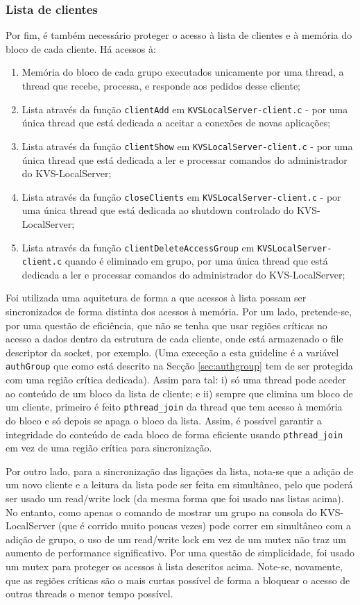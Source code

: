 \subsubsection{Lista de clientes}
Por fim, é também necessário proteger o acesso à lista de clientes e à memória do bloco de cada cliente. Há acessos à:
\begin{enumerate}[noitemsep]
    \item Memória do bloco de cada grupo executados unicamente por uma thread, a thread que recebe, processa, e responde aos pedidos desse cliente;
    \item Lista através da função \texttt{clientAdd} em \texttt{KVSLocalServer-client.c} - por uma única thread que está dedicada a aceitar a conexões de novas aplicações;
    \item Lista através da função \texttt{clientShow} em \texttt{KVSLocalServer-client.c} - por uma única thread que está dedicada a ler e processar comandos do administrador do KVS-LocalServer;
    \item Lista através da função \texttt{closeClients} em \texttt{KVSLocalServer-client.c} - por uma única thread que está dedicada ao shutdown controlado do KVS-LocalServer;
    \item Lista através da função \texttt{clientDeleteAccessGroup} em \texttt{KVSLocalServer-client.c} quando é eliminado em grupo, por uma única thread que está dedicada a ler e processar comandos do administrador do KVS-LocalServer;
\end{enumerate}

Foi utilizada uma aquitetura de forma a que acessos à lista possam ser sincronizados de forma distinta dos acessos à memória. Por um lado, pretende-se, por uma questão de eficiência, que não se tenha que usar regiões críticas no acesso a dados dentro da estrutura de cada cliente, onde está armazenado o file descriptor da socket, por exemplo. (Uma execeção a esta guideline é a variável \texttt{authGroup} que como está descrito na Secção \ref{sec:authgroup} tem de ser protegida com uma região crítica dedicada). Assim para tal: i) só uma thread pode aceder ao conteúdo de um bloco da lista de cliente; e ii) sempre que elimina um bloco de um cliente, primeiro é feito \texttt{pthread\_join} da thread que tem acesso à memória do bloco e só depois se apaga o bloco da lista. Assim, é possível garantir a integridade do conteúdo de cada bloco de forma eficiente usando \texttt{pthread\_join} em vez de uma região crítica para sincronização. 

Por outro lado, para a sincronização das ligações da lista, nota-se que a adição de um novo cliente e a leitura da lista pode ser feita em simultâneo, pelo que poderá ser usado um read/write lock (da mesma forma que foi usado nas listas acima). No entanto, como apenas o comando de mostrar um grupo na consola do KVS-LocalServer (que é corrido muito poucas vezes) pode correr em simultâneo com a adição de grupo, o uso de um read/write lock em vez de um mutex não traz um aumento de performance significativo. Por uma questão de simplicidade, foi usado um mutex para proteger os acessos à lista descritos acima. Note-se, novamente, que as regiões críticas são o mais curtas possível de forma a bloquear o acesso de outras threads o menor tempo possível.

